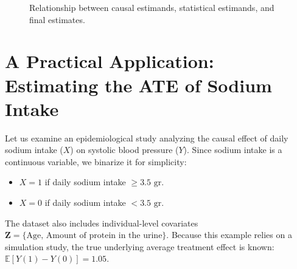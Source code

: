\begin{figure}[htbp]
    \centering
    \caption{Relationship between causal estimands, statistical estimands, and final estimates.}
    \label{fig:estimation_pipeline}
\end{figure}

\section{A Practical Application: Estimating the ATE of Sodium Intake}
Let us examine an epidemiological study analyzing the causal effect of daily sodium intake ($X$) on 
systolic blood pressure ($Y$). 
Since sodium intake is a continuous variable, we binarize it for simplicity:
\begin{itemize}
    \item $X = 1$ if daily sodium intake $\geq 3.5\text{ gr}$.
    \item $X = 0$ if daily sodium intake $< 3.5\text{ gr}$.
\end{itemize}
The dataset also includes individual-level covariates $\mathbf{Z} = 
\{\text{Age, Amount of protein in the urine}\}$. 
Because this example relies on a simulation study, the true underlying average treatment effect is 
known: $\mathbb{E}[Y(1) - Y(0)] = 1.05$.

